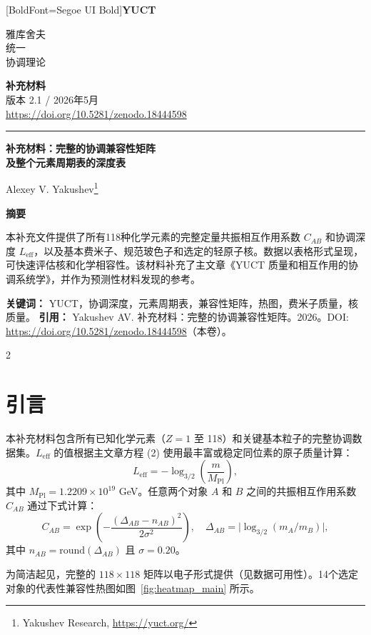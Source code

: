 \documentclass[11pt,a4paper]{article}
\newcommand{\makeheader}{%
	\noindent
	\begin{minipage}{0.17\textwidth}
		\raggedright
		{\fontspec{Segoe UI}[BoldFont=Segoe UI Bold]\bfseries\color{skyblue}\fontsize{46}{46}\selectfont YUCT}%
	\end{minipage}%
	\hspace{30pt}
	\begin{minipage}{0.32\textwidth}
		\raggedright
		{\sffamily\fontsize{11}{13}\selectfont 雅库舍夫\\ 统一\\ 协调理论}%
	\end{minipage}%
	\hfill
	\begin{minipage}{0.38\textwidth}
		\raggedleft
		{\sffamily\bfseries 补充材料}\\ 
		{\sffamily 版本 2.1 / 2026年5月}\\ 
		{\sffamily\footnotesize \url{https://doi.org/10.5281/zenodo.18444598}}%
	\end{minipage}
	\par\vspace{5pt}
	\noindent\textcolor{gold}{\rule{\textwidth}{1.6pt}}
	\par\vspace{0pt}
}
\begin{document}
	\thispagestyle{firstpage}
	\makeheader
	
	\vspace{0cm}
	{\LARGE\bfseries 补充材料：完整的协调兼容性矩阵 \\ 
		\Large 及整个元素周期表的深度表 \par}
	\vspace{0.2cm}
	
	{\large Alexey V. Yakushev\footnote{Yakushev Research, \url{https://yuct.org/}}} \\
	\vspace{0.0cm}
	
	{\color{darkblue}\textbf{\LARGE 摘要}} \par
	{\large
		\noindent
		本补充文件提供了所有118种化学元素的完整定量共振相互作用系数 \(C_{AB}\) 和协调深度 \(L_{\mathrm{eff}}\)，以及基本费米子、规范玻色子和选定的轻原子核。数据以表格形式呈现，可快速评估核和化学相容性。该材料补充了主文章《YUCT 质量和相互作用的协调系统学》，并作为预测性材料发现的参考。
	}
	
	\vspace{0.1cm}
	\noindent
	{\color{darkblue}\textbf{关键词：}} YUCT，协调深度，元素周期表，兼容性矩阵，热图，费米子质量，核质量。
	\vspace{0.1cm}
	\noindent
	{\color{darkblue}\textbf{引用：}} Yakushev AV. 补充材料：完整的协调兼容性矩阵。2026。DOI: \url{https://doi.org/10.5281/zenodo.18444598}（本卷）。
	
	\vspace{0.4cm}
	
	\begin{multicols}{2}
		\section*{引言}
		本补充材料包含所有已知化学元素（\(Z = 1\) 至 118）和关键基本粒子的完整协调数据集。\(L_{\mathrm{eff}}\) 的值根据主文章方程 (2) 使用最丰富或稳定同位素的原子质量计算：
		\[
		L_{\mathrm{eff}} = -\log_{3/2}\!\left( \frac{m}{M_{\mathrm{Pl}}} \right),
		\]
		其中 \(M_{\mathrm{Pl}} = 1.2209\times 10^{19}\) GeV。任意两个对象 \(A\) 和 \(B\) 之间的共振相互作用系数 \(C_{AB}\) 通过下式计算：
		\[
		C_{AB} = \exp\!\left( - \frac{(\Delta_{AB} - n_{AB})^2}{2\sigma^2} \right),\quad
		\Delta_{AB} = \bigl|\log_{3/2}(m_A/m_B)\bigr|,
		\]
		其中 \(n_{AB} = \text{round}(\Delta_{AB})\) 且 \(\sigma = 0.20\)。
		
		为简洁起见，完整的 \(118\times118\) 矩阵以电子形式提供（见数据可用性）。14个选定对象的代表性兼容性热图如图~\ref{fig:heatmap_main} 所示。
	\end{multicols}
	
\end{document}
